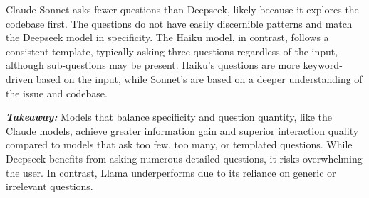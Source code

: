 Claude Sonnet asks fewer questions than Deepseek, likely because it explores the codebase first. The questions do not have easily discernible patterns and match the Deepseek model in specificity. The Haiku model, in contrast, follows a consistent template, typically asking three questions regardless of the input, although sub-questions may be present. Haiku's questions are more keyword-driven based on the input, while Sonnet's are based on a deeper understanding of the issue and codebase.

\begin{table}[ht]
\centering
{}
\caption{The average number of questions asked by different models in an interaction.}
\label{tab:average_questions}
\end{table}

\textbf{\textit{Takeaway:}} Models that balance specificity and question quantity, like the Claude models, achieve greater information gain and superior interaction quality compared to models that ask too few, too many, or templated questions. While Deepseek benefits from asking numerous detailed questions, it risks overwhelming the user. In contrast, Llama underperforms due to its reliance on generic or irrelevant questions.
\vspace{-12pt}